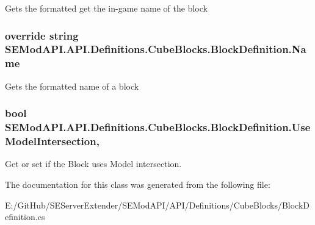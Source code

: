 Gets the formatted get the in-\/game name of the block 

\hypertarget{class_s_e_mod_a_p_i_1_1_a_p_i_1_1_definitions_1_1_cube_blocks_1_1_block_definition_a31eafb04ff3103712706e547f5a6c6b8}{}
\subsubsection[{Name}]{\setlength{\rightskip}{0pt plus 5cm}override string S\+E\+Mod\+A\+P\+I.\+A\+P\+I.\+Definitions.\+Cube\+Blocks.\+Block\+Definition.\+Name\hspace{0.3cm}{\ttfamily [get]}}\label{class_s_e_mod_a_p_i_1_1_a_p_i_1_1_definitions_1_1_cube_blocks_1_1_block_definition_a31eafb04ff3103712706e547f5a6c6b8}


Gets the formatted name of a block 

\hypertarget{class_s_e_mod_a_p_i_1_1_a_p_i_1_1_definitions_1_1_cube_blocks_1_1_block_definition_aedd2182e13f31d8344cfdc36595ce254}{}
\subsubsection[{Use\+Model\+Intersection}]{\setlength{\rightskip}{0pt plus 5cm}bool S\+E\+Mod\+A\+P\+I.\+A\+P\+I.\+Definitions.\+Cube\+Blocks.\+Block\+Definition.\+Use\+Model\+Intersection\hspace{0.3cm}{\ttfamily [get]}, {\ttfamily [set]}}\label{class_s_e_mod_a_p_i_1_1_a_p_i_1_1_definitions_1_1_cube_blocks_1_1_block_definition_aedd2182e13f31d8344cfdc36595ce254}


Get or set if the Block uses Model intersection. 



The documentation for this class was generated from the following file\+:\begin{DoxyCompactItemize}
\item 
E\+:/\+Git\+Hub/\+S\+E\+Server\+Extender/\+S\+E\+Mod\+A\+P\+I/\+A\+P\+I/\+Definitions/\+Cube\+Blocks/Block\+Definition.\+cs\end{DoxyCompactItemize}
